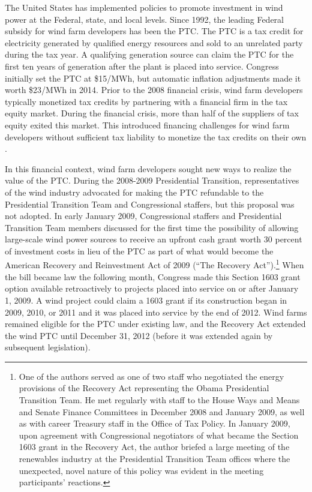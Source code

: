\documentclass[12pt]{article}
\begin{document}
The United States has implemented policies to promote investment in wind power at the Federal, state, and local levels. Since 1992, the leading Federal subsidy for wind farm developers has been the PTC. The PTC is a tax credit for electricity generated by qualified energy resources and sold to an unrelated party during the tax year. A qualifying generation source can claim the PTC for the first ten years of generation after the plant is placed into service. Congress initially set the PTC at \$15/MWh, but automatic inflation adjustments made it worth \$23/MWh in 2014. Prior to the 2008 financial crisis, wind farm developers typically monetized tax credits by partnering with a financial firm in the tax equity market. During the financial crisis, more than half of the suppliers of tax equity exited this market. This introduced financing challenges for wind farm developers without sufficient tax liability to monetize the tax credits on their own \citep{u.s._pref_prospective_2010}.

In this financial context, wind farm developers sought new ways to realize the value of the PTC. During the 2008-2009 Presidential Transition, representatives of the wind industry advocated for making the PTC refundable to the Presidential Transition Team and Congressional staffers, but this proposal was not adopted. In early January 2009, Congressional staffers and Presidential Transition Team members discussed for the first time the possibility of allowing large-scale wind power sources to receive an upfront cash grant worth 30 percent of investment costs in lieu of the PTC as part of what would become the American Recovery and Reinvestment Act of 2009 (``The Recovery Act'').\footnote{One of the authors served as one of two staff who negotiated the energy provisions of the Recovery Act representing the Obama Presidential Transition Team. He met regularly with staff to the House Ways and Means and Senate Finance Committees in December 2008 and January 2009, as well as with career Treasury staff in the Office of Tax Policy. In January 2009, upon agreement with Congressional negotiators of what became the Section 1603 grant in the Recovery Act, the author briefed a large meeting of the renewables industry at the Presidential Transition Team offices where the unexpected, novel nature of this policy was evident in the meeting participants' reactions.} When the bill became law the following month, Congress made this Section 1603 grant option available retroactively to projects placed into service on or after January 1, 2009. A wind project could claim a 1603 grant if its construction began in 2009, 2010, or 2011 and it was placed into service by the end of 2012. Wind farms remained eligible for the PTC under existing law, and the Recovery Act extended the wind PTC until December 31, 2012 (before it was extended again by subsequent legislation).
\end{document}
